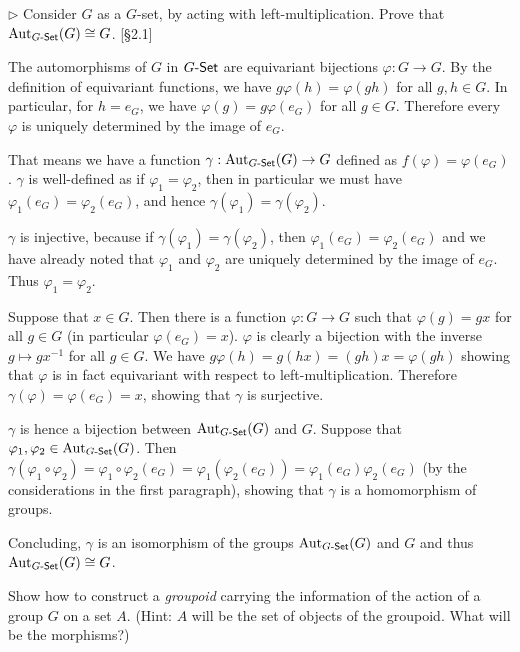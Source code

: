 \begin{problem}
	$\triangleright$ Consider $G$ as a $G$-set, by acting with left-multiplication. Prove that $\mathrm{Aut}_{G\text{-}\mathsf{Set}}(G) \cong G$. [\S 2.1]
\end{problem}

\begin{solution}
	The automorphisms of $G$ in $G\text{-}\mathsf{Set}$ are equivariant bijections $\varphi: G \to G$. By the definition of equivariant functions, we have $g \varphi(h) = \varphi(gh)$ for all $g, h \in G$. In particular, for $h = e_G$, we have $\varphi(g) = g \varphi(e_G)$ for all $g \in G$. Therefore every $\varphi$ is uniquely determined by the image of $e_G$.
	
	That means we have a function $\gamma: \mathrm{Aut}_{G\text{-}\mathsf{Set}}(G) \to G$ defined as $f(\varphi) = \varphi(e_G)$. $\gamma$ is well-defined as if $\varphi_1 = \varphi_2$, then in particular we must have $\varphi_1(e_G) = \varphi_2(e_G)$, and hence $\gamma(\varphi_1) = \gamma(\varphi_2)$.
	
	$\gamma$ is injective, because if $\gamma(\varphi_1) = \gamma(\varphi_2)$, then $\varphi_1(e_G) = \varphi_2(e_G)$ and we have already noted that $\varphi_1$ and $\varphi_2$ are uniquely determined by the image of $e_G$. Thus $\varphi_1 = \varphi_2$.
	
	Suppose that $x \in G$. Then there is a function $\varphi: G \to G$ such that $\varphi(g) = gx$ for all $g \in G$ (in particular $\varphi(e_G) = x$). $\varphi$ is clearly a bijection with the inverse $g \mapsto gx^{-1}$ for all $g \in G$. We have $g \varphi(h) = g (hx) = (gh) x = \varphi(gh)$ showing that $\varphi$ is in fact equivariant with respect to left-multiplication. Therefore $\gamma(\varphi) = \varphi(e_G) = x$, showing that $\gamma$ is surjective.
	
	$\gamma$ is hence a bijection between $\mathrm{Aut}_{G\text{-}\mathsf{Set}}(G)$ and $G$. Suppose that $\varphi_1, \varphi_2 \in \mathrm{Aut}_{G\text{-}\mathsf{Set}}(G)$. Then $\gamma(\varphi_1 \circ \varphi_2) = \varphi_1 \circ \varphi_2 (e_G) = \varphi_1 (\varphi_2(e_G)) = \varphi_1(e_G) \varphi_2(e_G)$ (by the considerations in the first paragraph), showing that $\gamma$ is a homomorphism of groups.
	
	Concluding, $\gamma$ is an isomorphism of the groups $\mathrm{Aut}_{G\text{-}\mathsf{Set}}(G)$ and $G$ and thus $\mathrm{Aut}_{G\text{-}\mathsf{Set}}(G) \cong G$.
\end{solution}

\begin{problem}
	Show how to construct a \emph{groupoid} carrying the information of the action of a group $G$ on a set $A$. (Hint: $A$ will be the set of objects of the groupoid. What will be the morphisms?)
\end{problem}

